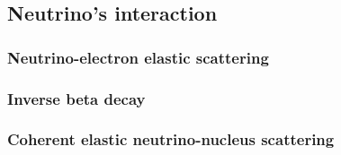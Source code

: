 \subsection{Neutrino's interaction} \label{sec:neutrino}

\subsubsection{Neutrino-electron elastic scattering}

\subsubsection{Inverse beta decay}

\subsubsection{Coherent elastic neutrino-nucleus scattering}

\clearpage
